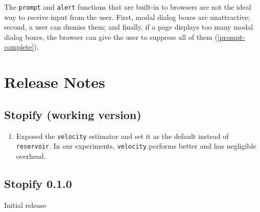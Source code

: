 \documentclass[10pt]{book}
\begin{document}
The \lstinline|prompt| and \lstinline|alert| functions that are built-in to
browsers are not the ideal way to receive input from the user. First, modal
dialog boxes are unattractive; second, a user can dismiss them; and finally, if
a page displays too many modal dialog boxes, the browser can give the user to
suppress all of them (\cref{prompt-complete}).

\appendix

\chapter{Release Notes}

\section{Stopify (working version)}

\begin{enumerate}

  \item Exposed the \texttt{velocity} estimator and set it as the default
  instead of \texttt{reservoir}. In our experiments, \texttt{velocity} performs
  better and has negligible overhead.

\end{enumerate}

\section{Stopify 0.1.0}

Initial release
\end{document}
